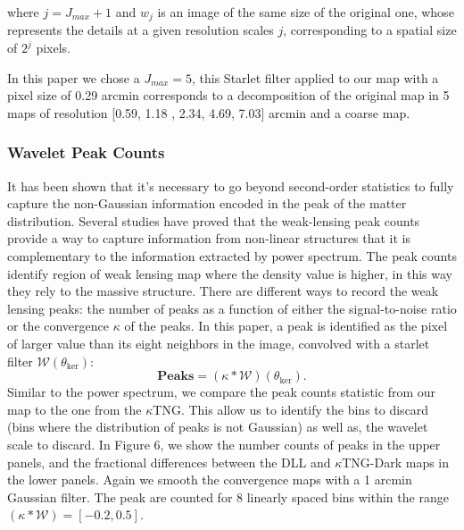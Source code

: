 \documentclass[twocolumn,twocolappendix]{aastex63}
\begin{document}
where $j = J_{max} + 1$ and $w_j$ is an image of the same size of the original one, whose represents the details at a given resolution scales $j$, corresponding to a spatial size of $2^j$ pixels.

 In this paper we chose a $J_{max}=5$, this Starlet filter applied to our map with a pixel size of 0.29 arcmin corresponds to a decomposition of the original map in 5 maps of resolution [0.59, 1.18 , 2.34, 4.69, 7.03] arcmin and a coarse map. 


\subsubsection{Wavelet Peak Counts}
It has been shown that it's necessary to go beyond second-order statistics to fully capture the non-Gaussian information encoded in the peak of the matter distribution. Several studies have proved that the  weak-lensing peak counts provide a way to capture information from non-linear structures that it is complementary to the information extracted by power spectrum.
The peak counts identify region of weak lensing map where the density value is higher, in this way they rely to the massive structure.
There are different ways to record the weak lensing peaks: the number of peaks as a function of either the signal-to-noise ratio or the convergence $\kappa$ of the peaks. 
In this paper, 
a peak is identified as the pixel of larger value than its eight neighbors in the image, convolved with a starlet filter $\mathcal{W}(\theta_{\text{ker}})$:
\begin{equation}
    \textbf{Peaks}=(\kappa*\mathcal{W})(\theta_{\text{ker}}).
\end{equation}
Similar to the power spectrum, we compare the peak counts statistic from our map to the one from the $\kappa$TNG.
This allow us to identify the bins to discard (bins where the distribution of peaks is not Gaussian) as well as, the wavelet scale to discard. 
In Figure 6, we show the number counts of peaks in the upper panels, and the fractional differences between the DLL and $\kappa$TNG-Dark maps in the lower panels.
Again we smooth the convergence maps with a 1 arcmin Gaussian filter. The peak are counted for 8 linearly spaced bins within the range $(\kappa*\mathcal{W})=[-0.2, 0.5]$. 
\end{document}

